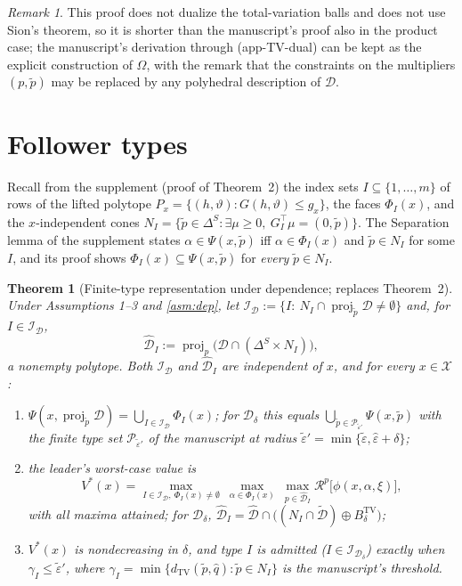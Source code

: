 \documentclass[11pt]{article}
\newtheorem{theorem}{Theorem}
\theoremstyle{definition}
\theoremstyle{remark}
\newtheorem{remark}{Remark}
\newcommand{\X}{\mathcal{X}}
\newcommand{\D}{\mathcal{D}}
\newcommand{\Dh}{\hat{\mathcal{D}}}
\newcommand{\Dt}{\tilde{\mathcal{D}}}
\newcommand{\tp}{\tilde{p}}
\newcommand{\heps}{\hat{\varepsilon}}
\newcommand{\teps}{\tilde{\varepsilon}}
\newcommand{\dtv}{d_{\mathrm{TV}}}
\newcommand{\R}{\mathcal{R}}
\DeclareMathOperator{\proj}{proj}
\begin{document}
\begin{remark}
This proof does not dualize the total-variation balls and does not use Sion's theorem, so it is shorter than the manuscript's proof also in the product case; the manuscript's derivation through (app-TV-dual) can be kept as the explicit construction of $\Omega$, with the remark that the constraints on the multipliers $(p,\tp)$ may be replaced by any polyhedral description of $\D$.
\end{remark}

\section{Follower types}

Recall from the supplement (proof of Theorem~2) the index sets $I\subseteq\{1,\dots,m\}$ of rows of the lifted polytope $P_x=\{(h,\vartheta):G(h,\vartheta)\le g_x\}$, the faces $\Phi_I(x)$, and the $x$-independent cones $N_I=\{\tp\in\Delta^S:\exists\mu\ge0,\ G_I^\top\mu=(0,\tp)\}$. The Separation lemma of the supplement states $\alpha\in\Psi(x,\tp)$ iff $\alpha\in\Phi_I(x)$ and $\tp\in N_I$ for some $I$, and its proof shows $\Phi_I(x)\subseteq\Psi(x,\tp)$ for \emph{every} $\tp\in N_I$.

\begin{theorem}[Finite-type representation under dependence; replaces Theorem~2]\label{thm:types}
Under Assumptions 1--3 and \ref{asm:dep}, let $\mathcal I_\D:=\{I:\ N_I\cap\proj_{\tp}\D\ne\emptyset\}$ and, for $I\in\mathcal I_\D$,
\[
  \Dh_I:=\proj_p\big(\D\cap(\Delta^S\times N_I)\big),
\]
a nonempty polytope. Both $\mathcal I_\D$ and $\Dh_I$ are independent of $x$, and for every $x\in\X$:
\begin{enumerate}[label=(\roman*),nosep]
\item $\Psi(x,\proj_{\tp}\D)=\bigcup_{I\in\mathcal I_\D}\Phi_I(x)$; for $\D_\delta$ this equals $\bigcup_{\tp\in\mathcal P_{\teps'}}\Psi(x,\tp)$ with the finite type set $\mathcal P_{\teps'}$ of the manuscript at radius $\teps'=\min\{\teps,\heps+\delta\}$;
\item the leader's worst-case value is
\begin{equation}\label{eq:Vtypes}
  V^*(x)=\max_{I\in\mathcal I_\D,\ \Phi_I(x)\ne\emptyset}\ \max_{\alpha\in\Phi_I(x)}\ \max_{p\in\Dh_I}\R^p\big[\phi(x,\alpha,\xi)\big],
\end{equation}
with all maxima attained; for $\D_\delta$, $\Dh_I=\Dh\cap\big((N_I\cap\Dt)\oplus B^{\mathrm{TV}}_\delta\big)$;
\item $V^*(x)$ is nondecreasing in $\delta$, and type $I$ is admitted ($I\in\mathcal I_{\D_\delta}$) exactly when $\gamma_I\le\teps'$, where $\gamma_I=\min\{\dtv(\tp,\hat q):\tp\in N_I\}$ is the manuscript's threshold.
\end{enumerate}
\end{theorem}
\end{document}
